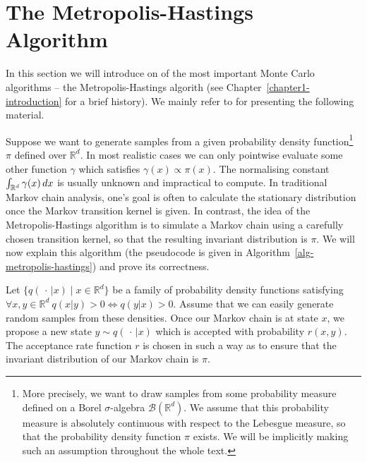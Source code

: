 \documentclass[report.tex]{subfiles}
\begin{document}
\chapter{The Metropolis-Hastings Algorithm}
\label{appendix-metropolis-hastings}

In this section we will introduce on of the most important Monte Carlo
algorithms -- the Metropolis-Hastings algorith (see Chapter~\ref{chapter1-introduction}
for a brief history).
We mainly refer to \citet{liu2008monte} for presenting the following material.

Suppose we want to generate samples from a given probability density function\footnote{
  More precisely, we want to draw samples from some probability measure
  defined on a Borel $\sigma$-algebra $\mathcal{B}(\mathbb{R}^{d})$. We assume
  that this probability measure is absolutely continuous with respect to the
  Lebesgue measure, so that the probability density function $\pi$ exists.
  We will be implicitly making such an assumption throughout the whole text.
}
$\pi$ defined over $\mathbb{R}^{d}$. In most
realistic cases we can only pointwise evaluate some other function $\gamma$ which
satisfies $\gamma(x) \propto \pi(x)$.
The normalising constant
$\int_{{\mathbb{R}^{d}}}^{{}} {\gamma(x)}\, d{x}$ is usually unknown and impractical
to compute.
In traditional Markov chain analysis, one's goal is often to calculate
the stationary distribution once the Markov transition kernel is given.
In contrast, the idea of the Metropolis-Hastings algorithm is to
simulate a Markov chain using a carefully chosen transition kernel,
so that the resulting invariant distribution is $\pi$.
We will now explain this algorithm
(the pseudocode is given in Algorithm~\ref{alg-metropolis-hastings})
and prove its correctness.

Let $\{q(\,\cdot\, \vert x) \mid x \in \mathbb{R}^d\}$
be a family of probability density functions satisfying
$\forall x,y \in \mathbb{R}^{d}\ q(x \vert y) > 0 \Leftrightarrow q(y \vert x) > 0$.
Assume that we can easily generate random samples from these densities.
Once our Markov chain is at state $x$, we propose a new state
$y \sim q(\,\cdot\, \vert x)$ which is accepted with probability
$r(x, y)$. The acceptance rate function $r$ is chosen in such a way as to
ensure that the invariant distribution of our Markov chain is $\pi$.
\end{document}
